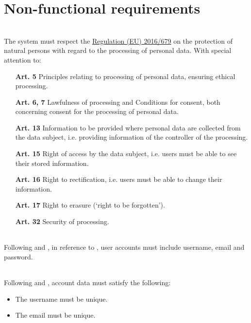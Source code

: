 \newpage

\section{Non-functional requirements}

 \\

\noindent The system must respect the \href{https://eur-lex.europa.eu/legal-content/EN/TXT/?uri=CELEX%3A02016R0679-20160504&qid=1532348683434}
{Regulation (EU) 2016/679} on the protection of natural persons with regard to the processing of personal data. 
With special attention to:
\begin{itemize}
	\item[\bf{Art. 5}] Principles relating to processing of personal data, ensuring ethical processing.
	\item[\bf{Art. 6, 7}] Lawfulness of processing and Conditions for consent, both concerning consent for the processing 
	of personal data.
	\item[\bf{Art. 13}] Information to be provided where personal data are collected from the data subject, 
	i.e. providing information of the controller of the processing.
	\item[\bf{Art. 15}] Right of access by the data subject, i.e. users must be able to see their stored information.
	\item[\bf{Art. 16}] Right to rectification, i.e. users must be able to change their information.
	\item[\bf{Art. 17}] Right to erasure (‘right to be forgotten’).
	\item[\bf{Art. 32}] Security of processing.
\end{itemize}

 \\

\noindent Following  and , in reference to , user accounts must include username, email and 
password.

 \\

\noindent Following  and , account data must satisfy the following:
\begin{itemize}
	\item The username must be unique.
	\item The email must be unique.
\end{itemize}

